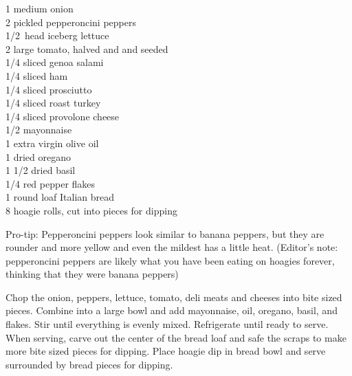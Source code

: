 \begin{ingredients}
    1 medium onion\\
    2 pickled pepperoncini peppers\\
    \SI{1/2}{head} iceberg lettuce\\
    2 large tomato, halved and and seeded\\
    \SI{1/4}{\pound} sliced genoa salami\\
    \SI{1/4}{\pound} sliced ham\\
    \SI{1/4}{\pound} sliced prosciutto\\
    \SI{1/4}{\pound} sliced roast turkey\\
    \SI{1/4}{\pound} sliced provolone cheese\\
    \SI{1/2}{\cup} mayonnaise\\
    \SI{1}{\tblspoon} extra virgin olive oil\\
    \SI{1}{\teaspoon} dried oregano\\
    1 \SI{1/2}{\teaspoon} dried basil\\
    \SI{1/4}{\teaspoon} red pepper flakes\\
    1 round loaf Italian bread\\
    8 hoagie rolls, cut into pieces for dipping\\
\end{ingredients}

\noindent Pro-tip: Pepperoncini peppers look similar to banana peppers, but they are rounder and more yellow and even the mildest has a little heat. (Editor's note: pepperoncini peppers are likely what you have been eating on hoagies forever, thinking that they were banana peppers)

Chop the onion, peppers, lettuce, tomato, deli meats and cheeses into bite sized pieces. Combine into a large bowl and add mayonnaise, oil, oregano, basil, and flakes. Stir until everything is evenly mixed. Refrigerate until ready to serve. When serving, carve out the center of the bread loaf and safe the scraps to make more bite sized pieces for dipping. Place hoagie dip in bread bowl and serve surrounded by bread pieces for dipping.

